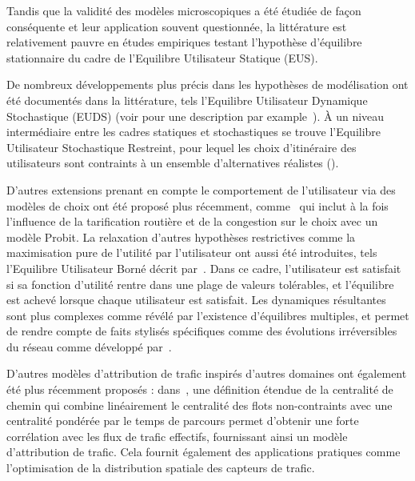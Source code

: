 {Tandis que la validité des modèles microscopiques a été étudiée de façon conséquente et leur application souvent questionnée, la littérature est relativement pauvre en études empiriques testant l'hypothèse d'équilibre stationnaire du cadre de l'Equilibre Utilisateur Statique (EUS).

De nombreux développements plus précis dans les hypothèses de modélisation ont été documentés dans la littérature, tels l'Equilibre Utilisateur Dynamique Stochastique (EUDS) (voir pour une description par example~\cite{han2003dynamic}). À un niveau intermédiaire entre les cadres statiques et stochastiques se trouve l'Equilibre Utilisateur Stochastique Restreint, pour lequel les choix d'itinéraire des utilisateurs sont contraints à un ensemble d'alternatives réalistes (\cite{rasmussen2015stochastic}).

D'autres extensions prenant en compte le comportement de l'utilisateur via des modèles de choix ont été proposé plus récemment, comme~\cite{zhang2013dynamic} qui inclut à la fois l'influence de la tarification routière et de la congestion sur le choix avec un modèle Probit. La relaxation d'autres hypothèses restrictives comme la maximisation pure de l'utilité par l'utilisateur ont aussi été introduites, tels l'Equilibre Utilisateur Borné décrit par~\cite{mahmassani1987boundedly}. Dans ce cadre, l'utilisateur est satisfait si sa fonction d'utilité rentre dans une plage de valeurs tolérables, et l'équilibre est achevé lorsque chaque utilisateur est satisfait. Les dynamiques résultantes sont plus complexes comme révélé par l'existence d'équilibres multiples, et permet de rendre compte de faits stylisés spécifiques comme des évolutions irréversibles du réseau comme développé par~\cite{guo2011bounded}.

D'autres modèles d'attribution de trafic inspirés d'autres domaines ont également été plus récemment proposés : dans~\cite{puzis2013augmented}, une définition étendue de la centralité de chemin qui combine linéairement le centralité des flots non-contraints avec une centralité pondérée par le temps de parcours permet d'obtenir une forte corrélation avec les flux de trafic effectifs, fournissant ainsi un modèle d'attribution de trafic. Cela fournit également des applications pratiques comme l'optimisation de la distribution spatiale des capteurs de trafic.
}

